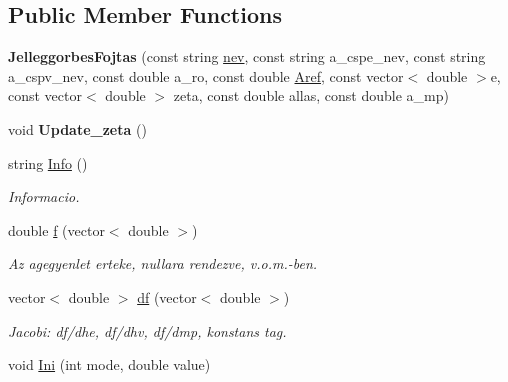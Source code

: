 \subsection*{Public Member Functions}
\begin{DoxyCompactItemize}
\item 
{\bfseries Jelleggorbes\+Fojtas} (const string \hyperlink{class_agelem_abe92b7e3912367d5d1caf6b277ca0b7d}{nev}, const string a\+\_\+cspe\+\_\+nev, const string a\+\_\+cspv\+\_\+nev, const double a\+\_\+ro, const double \hyperlink{class_agelem_a3f8668febc2958fd539997d537552f17}{Aref}, const vector$<$ double $>$e, const vector$<$ double $>$ zeta, const double allas, const double a\+\_\+mp)\hypertarget{class_jelleggorbes_fojtas_af66a653a2838a2a5a9669ecfd7dc6a0b}{}\label{class_jelleggorbes_fojtas_af66a653a2838a2a5a9669ecfd7dc6a0b}

\item 
void {\bfseries Update\+\_\+zeta} ()\hypertarget{class_jelleggorbes_fojtas_a8ac49ed546134b5147796be94b22521a}{}\label{class_jelleggorbes_fojtas_a8ac49ed546134b5147796be94b22521a}

\item 
string \hyperlink{class_jelleggorbes_fojtas_a86d24b2271e234200a7ecbdccd4e94c1}{Info} ()\hypertarget{class_jelleggorbes_fojtas_a86d24b2271e234200a7ecbdccd4e94c1}{}\label{class_jelleggorbes_fojtas_a86d24b2271e234200a7ecbdccd4e94c1}

\begin{DoxyCompactList}\small\item\em Informacio. \end{DoxyCompactList}\item 
double \hyperlink{class_jelleggorbes_fojtas_a86bd9df0aa43f56c29dd451c92368724}{f} (vector$<$ double $>$)\hypertarget{class_jelleggorbes_fojtas_a86bd9df0aa43f56c29dd451c92368724}{}\label{class_jelleggorbes_fojtas_a86bd9df0aa43f56c29dd451c92368724}

\begin{DoxyCompactList}\small\item\em Az agegyenlet erteke, nullara rendezve, v.\+o.\+m.-\/ben. \end{DoxyCompactList}\item 
vector$<$ double $>$ \hyperlink{class_jelleggorbes_fojtas_a4962bb9e88d9f4c6453f1e57ae3c2041}{df} (vector$<$ double $>$)\hypertarget{class_jelleggorbes_fojtas_a4962bb9e88d9f4c6453f1e57ae3c2041}{}\label{class_jelleggorbes_fojtas_a4962bb9e88d9f4c6453f1e57ae3c2041}

\begin{DoxyCompactList}\small\item\em Jacobi\+: df/dhe, df/dhv, df/dmp, konstans tag. \end{DoxyCompactList}\item 
void \hyperlink{class_jelleggorbes_fojtas_a6e095b972116dd9b3dd0635dbbd4edb9}{Ini} (int mode, double value)\hypertarget{class_jelleggorbes_fojtas_a6e095b972116dd9b3dd0635dbbd4edb9}{}\label{class_jelleggorbes_fojtas_a6e095b972116dd9b3dd0635dbbd4edb9}


\end{DoxyCompactItemize}
